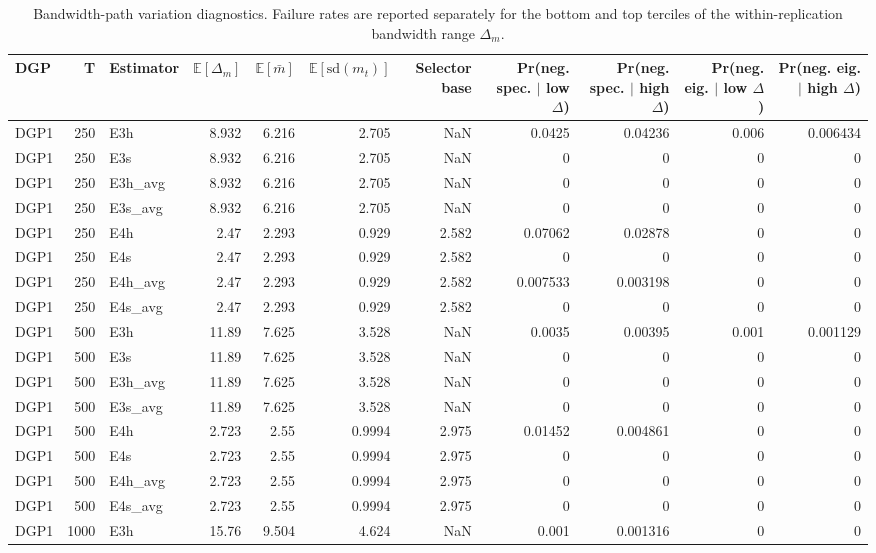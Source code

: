 \begin{table}[!htbp]
\centering
\caption{Bandwidth-path variation diagnostics. Failure rates are reported separately for the bottom and top terciles of the within-replication bandwidth range \(\Delta_m\).}
\label{tab:mc_variation}
\begin{tabular}{lrlrrrrrrrr}
\toprule
DGP & T & Estimator & $\mathbb{E}[\Delta_m]$ & $\mathbb{E}[\bar m]$ & $\mathbb{E}[\mathrm{sd}(m_t)]$ & Selector base & Pr(neg. spec. $|$ low $\Delta$) & Pr(neg. spec. $|$ high $\Delta$) & Pr(neg. eig. $|$ low $\Delta$) & Pr(neg. eig. $|$ high $\Delta$) \\
\midrule
DGP1 & 250 & E3h & 8.932 & 6.216 & 2.705 & NaN & 0.0425 & 0.04236 & 0.006 & 0.006434 \\
DGP1 & 250 & E3s & 8.932 & 6.216 & 2.705 & NaN & 0 & 0 & 0 & 0 \\
DGP1 & 250 & E3h_avg & 8.932 & 6.216 & 2.705 & NaN & 0 & 0 & 0 & 0 \\
DGP1 & 250 & E3s_avg & 8.932 & 6.216 & 2.705 & NaN & 0 & 0 & 0 & 0 \\
DGP1 & 250 & E4h & 2.47 & 2.293 & 0.929 & 2.582 & 0.07062 & 0.02878 & 0 & 0 \\
DGP1 & 250 & E4s & 2.47 & 2.293 & 0.929 & 2.582 & 0 & 0 & 0 & 0 \\
DGP1 & 250 & E4h_avg & 2.47 & 2.293 & 0.929 & 2.582 & 0.007533 & 0.003198 & 0 & 0 \\
DGP1 & 250 & E4s_avg & 2.47 & 2.293 & 0.929 & 2.582 & 0 & 0 & 0 & 0 \\
DGP1 & 500 & E3h & 11.89 & 7.625 & 3.528 & NaN & 0.0035 & 0.00395 & 0.001 & 0.001129 \\
DGP1 & 500 & E3s & 11.89 & 7.625 & 3.528 & NaN & 0 & 0 & 0 & 0 \\
DGP1 & 500 & E3h_avg & 11.89 & 7.625 & 3.528 & NaN & 0 & 0 & 0 & 0 \\
DGP1 & 500 & E3s_avg & 11.89 & 7.625 & 3.528 & NaN & 0 & 0 & 0 & 0 \\
DGP1 & 500 & E4h & 2.723 & 2.55 & 0.9994 & 2.975 & 0.01452 & 0.004861 & 0 & 0 \\
DGP1 & 500 & E4s & 2.723 & 2.55 & 0.9994 & 2.975 & 0 & 0 & 0 & 0 \\
DGP1 & 500 & E4h_avg & 2.723 & 2.55 & 0.9994 & 2.975 & 0 & 0 & 0 & 0 \\
DGP1 & 500 & E4s_avg & 2.723 & 2.55 & 0.9994 & 2.975 & 0 & 0 & 0 & 0 \\
DGP1 & 1000 & E3h & 15.76 & 9.504 & 4.624 & NaN & 0.001 & 0.001316 & 0 & 0 \\

\end{tabular}
\end{table}
